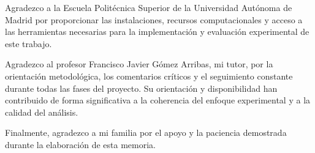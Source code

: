 Agradezco a la Escuela Politécnica Superior de la Universidad Autónoma de Madrid por proporcionar las instalaciones, recursos computacionales y acceso a las herramientas necesarias para la implementación y evaluación experimental de este trabajo.

Agradezco al profesor Francisco Javier Gómez Arribas, mi tutor, por la orientación metodológica, los comentarios críticos y el seguimiento constante durante todas las fases del proyecto. Su orientación y disponibilidad han contribuido de forma significativa a la coherencia del enfoque experimental y a la calidad del análisis.

Finalmente, agradezco a mi familia por el apoyo y la paciencia demostrada durante la elaboración de esta memoria.